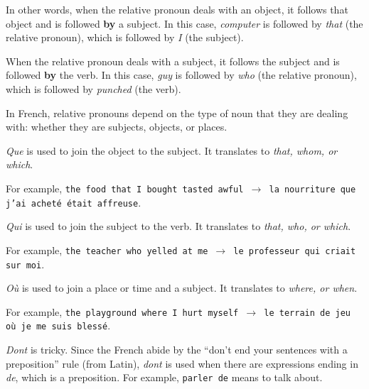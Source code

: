 \documentclass[11pt, oneside]{book}
\begin{document}
{{{In other words, when the relative pronoun deals with an object, it follows that object and is followed \textbf{by} a subject. In this case, \textit{computer} is followed by \textit{that} (the relative pronoun), which is followed by \textit{I} (the subject). \vspace{0.5\baselineskip}

When the relative pronoun deals with a subject, it follows the subject and is followed \textbf{by} the verb. In this case, \textit{guy} is followed by \textit{who} (the relative pronoun), which is followed by \textit{punched} (the verb). \vspace{0.5\baselineskip}

	In French, relative pronouns depend on the type of noun that they are dealing with: whether they are subjects, objects, or places. \vspace{0.5\baselineskip}

	\textit{Que} is used to join the object to the subject. It translates to \textit{that, whom, or which}. \vspace{0.5\baselineskip}

	For example, \texttt{the food that I bought tasted awful $\rightarrow$ la nourriture que j'ai achet\'e \'etait affreuse}.  \vspace{0.5\baselineskip}

	\textit{Qui} is used to join the subject to the verb. It translates to \textit{that, who, or which}. \vspace{0.5\baselineskip}

	For example, \texttt{the teacher who yelled at me $\rightarrow$ le professeur qui criait sur moi}. \vspace{0.5\baselineskip}

	\textit{O\`u} is used to join a place or time and a subject. It translates to \textit{where, or when}. \vspace{0.25\baselineskip}

	For example, \texttt{the playground where I hurt myself $\rightarrow$ le terrain de jeu o\`u je me suis bless\'e}. \vspace{0.5\baselineskip}

	\textit{Dont} is tricky. Since the French abide by the “don't end your sentences with a preposition” rule (from Latin), \textit{dont} is used when there are expressions ending in \textit{de}, which is a preposition. For example, \texttt{parler de} means to talk about. \vspace{0.5\baselineskip}

}}}
\end{document}
